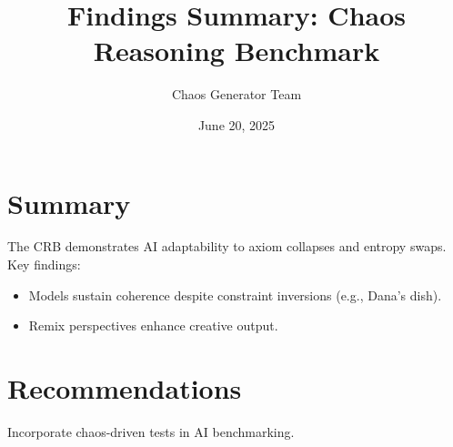 \documentclass[a4paper,11pt]{article}
\title{Findings Summary: Chaos Reasoning Benchmark}
\author{Chaos Generator Team}
\date{June 20, 2025}
\begin{document}
\maketitle
\section{Summary}
The CRB demonstrates AI adaptability to axiom collapses and entropy swaps. Key findings:
\begin{itemize}
\item Models sustain coherence despite constraint inversions (e.g., Dana’s dish).
\item Remix perspectives enhance creative output.
\end{itemize}
\section{Recommendations}
Incorporate chaos-driven tests in AI benchmarking.
\end{document}
